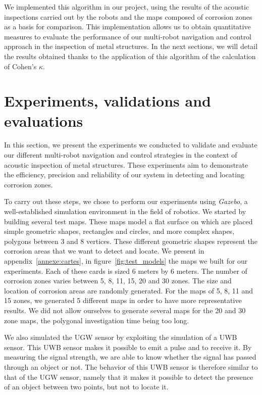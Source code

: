 \documentclass[english,RandD]{rapportPFE}  %
\begin{document}
			We implemented this algorithm in our project, using the results of the acoustic inspections carried out by the robots and the maps composed of corrosion zones as a basis for comparison.
			This implementation allows us to obtain quantitative measures to evaluate the performance of our multi-robot navigation and control approach in the inspection of metal structures.
			In the next sections, we will detail the results obtained thanks to the application of this algorithm of the calculation of Cohen's $\kappa$.
	\section{Experiments, validations and evaluations}
		In this section, we present the experiments we conducted to validate and evaluate our different multi-robot navigation and control strategies in the context of acoustic inspection of metal structures.
		These experiments aim to demonstrate the efficiency, precision and reliability of our system in detecting and locating corrosion zones.

		To carry out these steps, we chose to perform our experiments using \textit{Gazebo}, a well-established simulation environment in the field of robotics.
		We started by building several test maps.
		These maps model a flat surface on which are placed simple geometric shapes, rectangles and circles, and more complex shapes, polygons between 3 and 8 vertices.
		These different geometric shapes represent the corrosion areas that we want to detect and locate.
		We present in appendix~\ref{annexe:cartes}, in figure~\ref{fig:test_models} the maps we built for our experiments.
		Each of these cards is sized 6 meters by 6 meters.
		The number of corrosion zones varies between 5, 8, 11, 15, 20 and 30 zones.
		The size and location of corrosion areas are randomly generated.
		For the maps of 5, 8, 11 and 15 zones, we generated 5 different maps in order to have more representative results.
		We did not allow ourselves to generate several maps for the 20 and 30 zone maps, the polygonal investigation time being too long.

		We also simulated the UGW sensor by exploiting the simulation of a UWB sensor.
		This UWB sensor makes it possible to emit a pulse and to receive it.
		By measuring the signal strength, we are able to know whether the signal has passed through an object or not.
		The behavior of this UWB sensor is therefore similar to that of the UGW sensor, namely that it makes it possible to detect the presence of an object between two points, but not to locate it.
\end{document}
